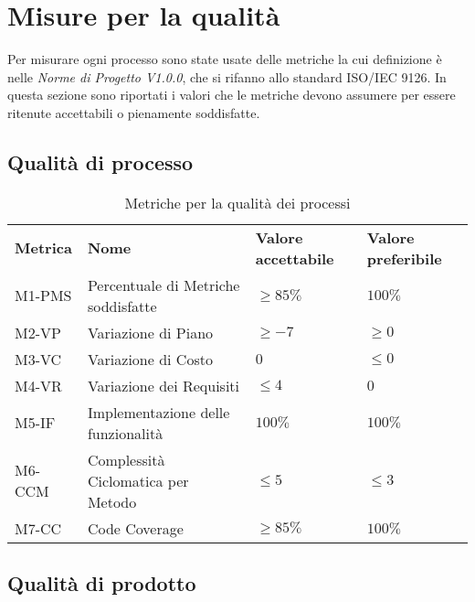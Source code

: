 \section{Misure per la qualità} \label{misure}
Per misurare ogni processo sono state usate delle metriche la cui definizione
 è nelle \textit{Norme di Progetto V1.0.0}, che si rifanno allo standard 
ISO/IEC 9126. In questa sezione sono riportati i valori che le metriche 
devono assumere per essere ritenute accettabili o pienamente soddisfatte.

\subsection{Qualità di processo}



\begin{table}[h]
    \begin{adjustbox}{width=\textwidth}
    \centering
    \renewcommand{\arraystretch}{1.5}
    \begin{tabular}{>{\centering\arraybackslash} m{2cm} >{\centering\arraybackslash} m{6cm} >{\centering\arraybackslash} m{3cm} >{\centering\arraybackslash} m{3cm}}
    \rowcolor[HTML]{bfbfbf} 
    \textbf{Metrica} & \textbf{Nome} & \textbf{Valore accettabile} & \textbf{Valore preferibile} \\
    M1-PMS & Percentuale di  Metriche soddisfatte & $\ge 85\%$ & $100\%$\\
    M2-VP & Variazione di Piano & $\ge -7$ & $\ge 0$\\
    M3-VC & Variazione di Costo & $0$ & $\le 0$\\
    M4-VR & Variazione dei Requisiti & $\le 4$ & $0$\\
    M5-IF & Implementazione delle funzionalità & $100\%$ & $100\%$\\
    M6-CCM & Complessità Ciclomatica per Metodo & $\le 5$ & $\le 3$\\
    M7-CC  & Code Coverage & $\ge 85\%$ & $100\%$               
    \end{tabular}
    \end{adjustbox}
    \caption{Metriche per la qualità dei processi}
\end{table}

\clearpage


\subsection{Qualità di prodotto}


